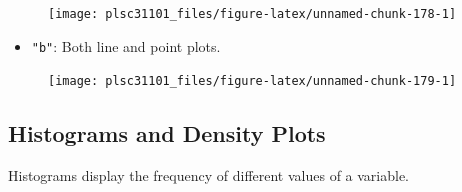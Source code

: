 \documentclass[]{book}
\newenvironment{Shaded}{\begin{snugshade}}{\end{snugshade}}
\newcommand{\KeywordTok}[1]{\textcolor[rgb]{0.13,0.29,0.53}{\textbf{#1}}}
\newcommand{\DataTypeTok}[1]{\textcolor[rgb]{0.13,0.29,0.53}{#1}}
\newcommand{\StringTok}[1]{\textcolor[rgb]{0.31,0.60,0.02}{#1}}
\newcommand{\CommentTok}[1]{\textcolor[rgb]{0.56,0.35,0.01}{\textit{#1}}}
\newcommand{\OperatorTok}[1]{\textcolor[rgb]{0.81,0.36,0.00}{\textbf{#1}}}
\newcommand{\NormalTok}[1]{#1}
\providecommand{\tightlist}{%
  \setlength{\itemsep}{0pt}\setlength{\parskip}{0pt}}
\begin{document}
\begin{Shaded}
\end{Shaded}

\begin{figure}

{\centering \texttt{[image: plsc31101\_files/figure-latex/unnamed-chunk-178-1]} 

}

\caption{ }\label{fig:unnamed-chunk-178}
\end{figure}

\begin{itemize}
\tightlist
\item
  \texttt{"b"}: Both line and point plots.
\end{itemize}

\begin{Shaded}
\end{Shaded}

\begin{figure}

{\centering \texttt{[image: plsc31101\_files/figure-latex/unnamed-chunk-179-1]} 

}

\caption{ }\label{fig:unnamed-chunk-179}
\end{figure}

\subsection{Histograms and Density
Plots}\label{histograms-and-density-plots}

Histograms display the frequency of different values of a variable.

\begin{Shaded}
\end{Shaded}
\end{document}
